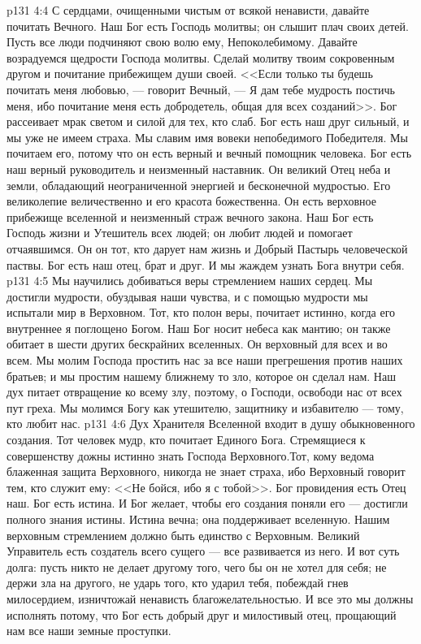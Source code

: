 \vs p131 4:4 С сердцами, очищенными чистым от всякой ненависти, давайте почитать Вечного. Наш Бог есть Господь молитвы; он слышит плач своих детей. Пусть все люди подчиняют свою волю ему, Непоколебимому. Давайте возрадуемся щедрости Господа молитвы. Сделай молитву твоим сокровенным другом и почитание прибежищем души своей. <<Если только ты будешь почитать меня любовью, --- говорит Вечный, --- Я дам тебе мудрость постичь меня, ибо почитание меня есть добродетель, общая для всех созданий>>. Бог рассеивает мрак светом и силой для тех, кто слаб. Бог есть наш друг сильный, и мы уже не имеем страха. Мы славим имя вовеки непобедимого Победителя. Мы почитаем его, потому что он есть верный и вечный помощник человека. Бог есть наш верный руководитель и неизменный наставник. Он великий Отец неба и земли, обладающий неограниченной энергией и бесконечной мудростью. Его великолепие величественно и его красота божественна. Он есть верховное прибежище вселенной и неизменный страж вечного закона. Наш Бог есть Господь жизни и Утешитель всех людей; он любит людей и помогает отчаявшимся. Он он тот, кто дарует нам жизнь и Добрый Пастырь человеческой паствы. Бог есть наш отец, брат и друг. И мы жаждем узнать Бога внутри себя.
\vs p131 4:5 Мы научились добиваться веры стремлением наших сердец. Мы достигли мудрости, обуздывая наши чувства, и с помощью мудрости мы испытали мир в Верховном. Тот, кто полон веры, почитает истинно, когда его внутреннее я поглощено Богом. Наш Бог носит небеса как мантию; он также обитает в шести других бескрайних вселенных. Он верховный для всех и во всем. Мы молим Господа простить нас за все наши прегрешения против наших братьев; и мы простим нашему ближнему то зло, которое он сделал нам. Наш дух питает отвращение ко всему злу, поэтому, о Господи, освободи нас от всех пут греха. Мы молимся Богу как утешителю, защитнику и избавителю --- тому, кто любит нас.
\vs p131 4:6 Дух Хранителя Вселенной входит в душу обыкновенного создания. Тот человек мудр, кто почитает Единого Бога. Стремящиеся к совершенству дожны истинно знать Господа Верховного.Тот, кому ведома блаженная защита Верховного, никогда не знает страха, ибо Верховный говорит тем, кто служит ему: <<Не бойся, ибо я с тобой>>. Бог провидения есть Отец наш. Бог есть истина. И Бог желает, чтобы его создания поняли его --- достигли полного знания истины. Истина вечна; она поддерживает вселенную. Нашим верховным стремлением должно быть единство с Верховным. Великий Управитель есть создатель всего сущего --- все развивается из него. И вот суть долга: пусть никто не делает другому того, чего бы он не хотел для себя; не держи зла на другого, не ударь того, кто ударил тебя, побеждай гнев милосердием, изничтожай ненависть благожелательностью. И все это мы должны исполнять потому, что Бог есть добрый друг и милостивый отец, прощающий нам все наши земные проступки.
